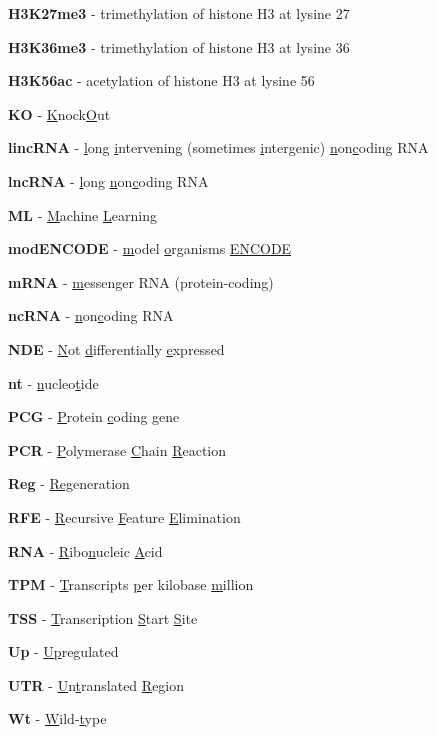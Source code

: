 \begin{scriptsize}
\begin{myitemize}
  \item[]\textbf{H3K27me3} - trimethylation of histone H3 at lysine 27
  \item[]\textbf{H3K36me3} - trimethylation of histone H3 at lysine 36
  \item[]\textbf{H3K56ac} - acetylation of histone H3 at lysine 56
  \item[]\textbf{KO} - \underline{K}nock\underline{O}ut
  \item[] \textbf{lincRNA} - \underline{l}ong \underline{i}ntervening (sometimes \underline{i}ntergenic) \underline{n}on\underline{c}oding RNA
  \item[] \textbf{lncRNA} - \underline{l}ong \underline{n}on\underline{c}oding RNA
  \item[] \textbf{ML} - \underline{M}achine \underline{L}earning
  \item[] \textbf{modENCODE} - \underline{m}odel \underline{o}rganisms \underline{ENCODE} 
  \item[] \textbf{mRNA} - \underline{m}essenger RNA (protein-coding)
  \item[] \textbf{ncRNA} - \underline{n}on\underline{c}oding RNA
  \item[] \textbf{NDE} - \underline{N}ot \underline{d}ifferentially \underline{e}xpressed
  \item[] \textbf{nt} - \underline{n}ucleo\underline{t}ide
  \item[] \textbf{PCG} - \underline{P}rotein \underline{c}oding \underline{g}ene
  \item[] \textbf{PCR} - \underline{P}olymerase \underline{C}hain \underline{R}eaction
  \item[] \textbf{Reg} - \underline{R}\underline{e}\underline{g}eneration
  \item[] \textbf{RFE} - \underline{R}ecursive \underline{F}eature \underline{E}limination 
  \item[] \textbf{RNA} - \underline{R}ibo\underline{n}ucleic \underline{A}cid
  \item[] \textbf{TPM} - \underline{T}ranscripts \underline{p}er kilobase \underline{m}illion
  \item[] \textbf{TSS} - \underline{T}ranscription \underline{S}tart \underline{S}ite
  \item[] \textbf{Up} - \underline{Up}regulated
  \item[] \textbf{UTR} - \underline{U}n\underline{t}ranslated \underline{R}egion
  \item[] \textbf{Wt} - \underline{W}ild-\underline{t}ype
  \end{myitemize}
\end{scriptsize}

